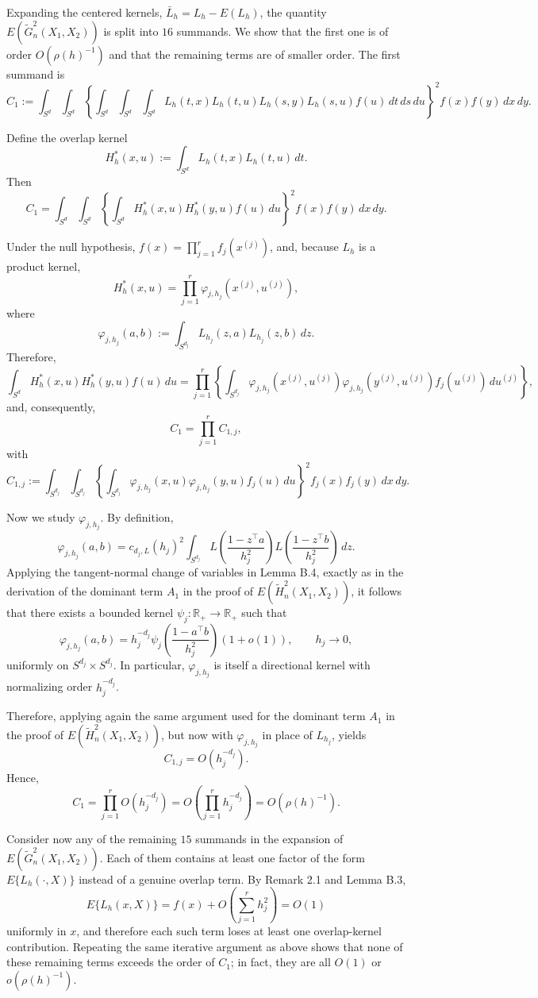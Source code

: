 \documentclass{article}
\begin{document}
Expanding the centered kernels, $\bar L_h=L_h-E(L_h)$, the quantity
$E(\widetilde G_n^2(X_1,X_2))$ is split into $16$ summands. We show that the first one is of
order $O(\rho(h)^{-1})$ and that the remaining terms are of smaller order. The first summand is
\[
C_1:=
\int_{S^d}\int_{S^d}
\left\{
\int_{S^d}\int_{S^d}\int_{S^d}
L_h(t,x)L_h(t,u)L_h(s,y)L_h(s,u)f(u)\,dt\,ds\,du
\right\}^2
f(x)f(y)\,dx\,dy.
\]

Define the overlap kernel
\[
H_h^*(x,u):=\int_{S^d}L_h(t,x)L_h(t,u)\,dt.
\]
Then
\[
C_1=
\int_{S^d}\int_{S^d}
\left\{
\int_{S^d}H_h^*(x,u)H_h^*(y,u)f(u)\,du
\right\}^2
f(x)f(y)\,dx\,dy.
\]

Under the null hypothesis, $f(x)=\prod_{j=1}^r f_j(x^{(j)})$, and, because $L_h$ is a product kernel,
\[
H_h^*(x,u)=\prod_{j=1}^r \varphi_{j,h_j}(x^{(j)},u^{(j)}),
\]
where
\[
\varphi_{j,h_j}(a,b):=
\int_{S^{d_j}}L_{h_j}(z,a)L_{h_j}(z,b)\,dz.
\]
Therefore,
\[
\int_{S^d}H_h^*(x,u)H_h^*(y,u)f(u)\,du
=
\prod_{j=1}^r
\left\{
\int_{S^{d_j}}
\varphi_{j,h_j}(x^{(j)},u^{(j)})
\varphi_{j,h_j}(y^{(j)},u^{(j)})
f_j(u^{(j)})\,du^{(j)}
\right\},
\]
and, consequently,
\[
C_1=\prod_{j=1}^r C_{1,j},
\]
with
\[
C_{1,j}:=
\int_{S^{d_j}}\int_{S^{d_j}}
\left\{
\int_{S^{d_j}}
\varphi_{j,h_j}(x,u)\varphi_{j,h_j}(y,u)f_j(u)\,du
\right\}^2
f_j(x)f_j(y)\,dx\,dy.
\]

Now we study $\varphi_{j,h_j}$. By definition,
\[
\varphi_{j,h_j}(a,b)
=
c_{d_j,L}(h_j)^2
\int_{S^{d_j}}
L\!\left(\frac{1-z^\top a}{h_j^2}\right)
L\!\left(\frac{1-z^\top b}{h_j^2}\right)\,dz.
\]
Applying the tangent-normal change of variables in Lemma B.4, exactly as in the derivation of the
dominant term $A_1$ in the proof of $E(\widetilde H_n^2(X_1,X_2))$, it follows that there exists a
bounded kernel $\psi_j:\mathbb R_+\to\mathbb R_+$ such that
\[
\varphi_{j,h_j}(a,b)
=
h_j^{-d_j}\psi_j\!\left(\frac{1-a^\top b}{h_j^2}\right)(1+o(1)),
\qquad h_j\to0,
\]
uniformly on $S^{d_j}\times S^{d_j}$. In particular, $\varphi_{j,h_j}$ is itself a directional kernel
with normalizing order $h_j^{-d_j}$.

Therefore, applying again the same argument used for the dominant term $A_1$ in the proof of
$E(\widetilde H_n^2(X_1,X_2))$, but now with $\varphi_{j,h_j}$ in place of $L_{h_j}$, yields
\[
C_{1,j}=O(h_j^{-d_j}).
\]
Hence,
\[
C_1
=
\prod_{j=1}^r O(h_j^{-d_j})
=
O\!\left(\prod_{j=1}^r h_j^{-d_j}\right)
=
O(\rho(h)^{-1}).
\]

Consider now any of the remaining $15$ summands in the expansion of
$E(\widetilde G_n^2(X_1,X_2))$. Each of them contains at least one factor of the form
$E\{L_h(\cdot,X)\}$ instead of a genuine overlap term. By Remark 2.1 and Lemma B.3,
\[
E\{L_h(x,X)\}=f(x)+O\!\left(\sum_{j=1}^r h_j^2\right)=O(1)
\]
uniformly in $x$, and therefore each such term loses at least one overlap-kernel contribution.
Repeating the same iterative argument as above shows that none of these remaining terms exceeds
the order of $C_1$; in fact, they are all $O(1)$ or $o(\rho(h)^{-1})$.
\end{document}
